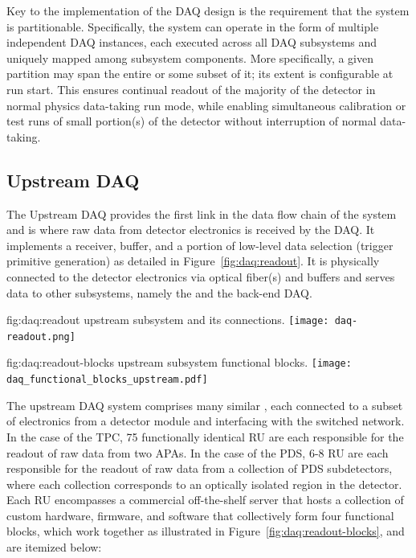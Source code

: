 Key to the implementation of the DAQ design is the requirement that
the system is partitionable. Specifically, the system can operate in
the form of multiple independent DAQ instances, each 
executed across all DAQ subsystems and uniquely mapped among subsystem components. 
More specifically, a given partition may span the entire %
 or some subset of it; its extent is configurable at
run start. This ensures continual readout of the
majority of the detector in normal physics data-taking run mode, while
enabling simultaneous calibration or test runs of small portion(s) of the
detector without interruption of normal data-taking. 

\subsection{Upstream DAQ}
\label{sec:daq:design-upstream}

The Upstream DAQ provides the first link in the data flow chain of
the  system and is where raw data from detector electronics
is received by the DAQ.
It implements a receiver, buffer, and a portion of low-level data
selection (trigger primitive generation) as detailed in Figure~\ref{fig:daq:readout}.
It is physically connected to the detector electronics via optical
fiber(s) and buffers and serves data to other  subsystems,
namely the  and the back-end DAQ.

\begin{dunefigure}{fig:daq:readout}{ upstream  subsystem and its connections.}
  \texttt{[image: daq-readout.png]}
\end{dunefigure}

\begin{dunefigure}{fig:daq:readout-blocks}{ upstream
     subsystem functional blocks.}
  \texttt{[image: daq\_functional\_blocks\_upstream.pdf]}
\end{dunefigure}

The upstream DAQ system comprises many similar , each
connected to a subset of electronics from a detector module and
interfacing with the  switched network. In the case of the
TPC, 75 functionally identical RU are each responsible for the readout of raw data from two
APAs. In the case of the PDS, 6-8 RU are each responsible for the
readout of raw data from a collection of PDS subdetectors, where each
collection corresponds to an optically isolated region in the
detector. 
Each RU encompasses a commercial off-the-shelf server that hosts a
collection of custom hardware, 
firmware, and software that collectively form four functional blocks,
which work together 
as illustrated in Figure~\ref{fig:daq:readout-blocks}, and are
itemized below:

